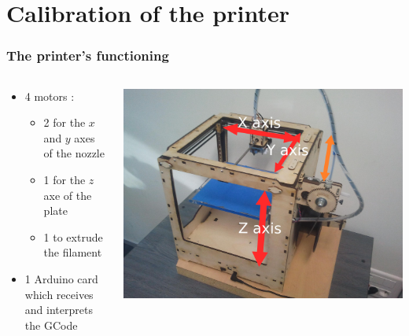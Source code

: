 \documentclass{beamer}
\begin{document}
\section{Calibration of the printer}
\begin{frame}
	\frametitle{The printer's functioning}
    
    
    \begin{columns}[t]
  	\begin{column}{5cm}
        \begin{block}{}
	\begin{itemize}
	\item 4 motors : 
		\begin{itemize}
		\item 2 for the $x$ and $y$ axes of the nozzle
		\item 1 for the $z$ axe of the plate
		\item 1 to extrude the filament
		\end{itemize}
	\item 1 Arduino card which receives and interprets the GCode
	\end{itemize}	
    \end{block}
    \end{column}

    \begin{column}{6cm}
        \begin{center}
		\includegraphics[width=.8\textwidth]{Ultimaker2}	
	\end{center}
    \end{column}

    \end{columns}
    
\end{frame}
\end{document}
